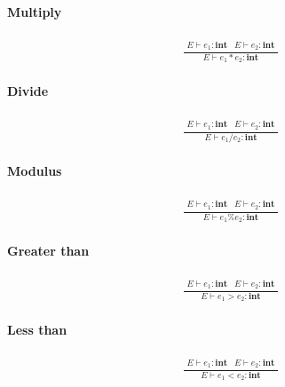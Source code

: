 \documentclass[paper=a4, fontsize=11pt]{article}
\numberwithin{equation}{section}	%
\numberwithin{figure}{section}		%
\numberwithin{table}{section}		%
\begin{document}
            \paragraph*{Multiply}
            \begin{align*}
                \frac{
                \begin{array}{ll}
                E \vdash e_1 : \textbf{int} & E \vdash e_2 : \textbf{int}
                \end{array} }{E \vdash e_1*e_2 : \textbf{int}}
            \end{align*}

            \paragraph*{Divide}
            \begin{align*}
                \frac{
                \begin{array}{ll}
                E \vdash e_1 : \textbf{int} & E \vdash e_2 : \textbf{int}
                \end{array} }{E \vdash e_1/e_2 : \textbf{int}}
            \end{align*}
                
            \paragraph*{Modulus}
            \begin{align*}
                \frac{
                \begin{array}{ll}
                E \vdash e_1 : \textbf{int} & E \vdash e_2 : \textbf{int}
                \end{array} }{E \vdash e_1\%e_2 : \textbf{int}}
            \end{align*}
                
            \paragraph*{Greater than}
            \begin{align*}
                \frac{
                \begin{array}{ll}
                E \vdash e_1 : \textbf{int} & E \vdash e_2 : \textbf{int}
                \end{array} }{E \vdash e_1>e_2 : \textbf{int}}
            \end{align*}

            \paragraph*{Less than}
            \begin{align*}
                \frac{
                \begin{array}{ll}
                E \vdash e_1 : \textbf{int} & E \vdash e_2 : \textbf{int}
                \end{array} }{E \vdash e_1<e_2 : \textbf{int}}
            \end{align*}
                
\end{document}
